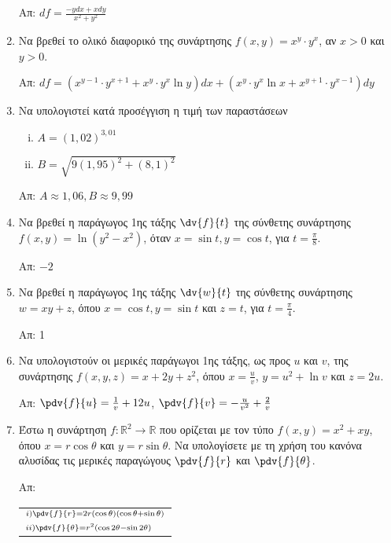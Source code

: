 \begin{enumerate}
	\hfill Απ: $df = \frac{ -ydx + xdy }{ x^{2} + y^{2} } $ 

\item Να βρεθεί το ολικό διαφορικό της συνάρτησης $ f(x,y) = x^{y} \cdot y^{x} $, αν $ x>0$ και $ y>0 $.

	\hfill Απ: $\scriptstyle{df =  (x^{y-1}\cdot y^{x+1} + x^{y}\cdot y^{x} \ln{y} )dx + (x^{y}\cdot y^{x} \ln{x} + x^{y+1} \cdot y^{x-1})dy} $ 

\item Να υπολογιστεί κατά προσέγγιση η τιμή των παραστάσεων
 \begin{enumerate}[i)]
 	\item $A = (1,02)^{3,01} $
	\item $B =  \sqrt{ 9(1,95)^{2} + (8,1)^{2} } $ 
 \end{enumerate}	

 \hfill Απ: $\scriptstyle{ A \approx 1,06 ,  B \approx 9,99} $

 
\item Να βρεθεί η παράγωγος 1ης τάξης $\dv{f}{t}$ της σύνθετης συνάρτησης $f(x,y)=\ln(y^2-x^2)$, όταν $x=\sin t, y=\cos t$, για $t=\frac{\pi}{8}$.

\hfill Απ: $\scriptstyle{-2}$

\item Να βρεθεί η παράγωγος 1ης τάξης $\dv{w}{t}$ της σύνθετης συνάρτησης $ w = xy+z $, όπου $ x =
	\cos{t}, y = \sin{t}$ και $ z = t $, για $ t = \frac{ \pi }{ 4 } $.

	\hfill Απ: 1

\item Να υπολογιστούν οι μερικές παράγωγοι 1ης τάξης, ως προς $u$ και $v$, της συνάρτησης $ f(x,y,z)
	= x + 2y + z^{2}$, όπου $ x = \frac{ u }{ v } $, $y = u^{2} + \ln{v} $ και $ z = 2u $.

	\hfill Απ: $ \pdv{f}{u} = \frac{1}{ v } + 12u $, $\pdv{f}{v} = -\frac{ u }{ v^{2} } + \frac{
	2 }{ v } $

 \item Έστω η συνάρτηση $ f : \mathbb{R}^{2} \to \mathbb{R} $ που ορίζεται με τον τύπο $ f(x,y) =
	 x^{2} + xy $, όπου $ x=r \cos{\theta} $ και $ y= r \sin{\theta} $. Να υπολογίσετε με τη χρήση
	 του κανόνα αλυσίδας τις μερικές παραγώγους $ \pdv{f}{r} $ και $ \pdv{f}{\theta} $.

	 \hfill Απ: \begin{tabular}{l}
		 $\scriptstyle{i) \pdv{f}{r} = 2r(\cos{\theta} )(\cos{\theta} + \sin{\theta})}
			 $ \\
			 $\scriptstyle{ii) \pdv{f}{\theta}=r^{2}(\cos{2\theta} - \sin{2 \theta})} $
	 \end{tabular}



\end{enumerate}
